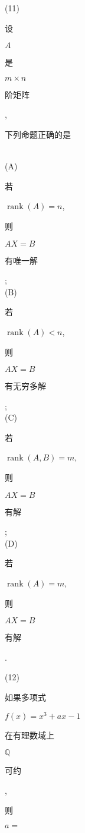 \documentclass[10pt]{article}
\begin{document}
(11) \begin{CJK}{UTF8}{mj}设\end{CJK} $A$ \begin{CJK}{UTF8}{mj}是\end{CJK} $m \times n$ \begin{CJK}{UTF8}{mj}阶矩阵\end{CJK},\begin{CJK}{UTF8}{mj}下列命题正确的是\end{CJK}\\
(A) \begin{CJK}{UTF8}{mj}若\end{CJK} $\operatorname{rank}(A)=n$, \begin{CJK}{UTF8}{mj}则\end{CJK} $A X=B$ \begin{CJK}{UTF8}{mj}有唯一解\end{CJK};\\
(B) \begin{CJK}{UTF8}{mj}若\end{CJK} $\operatorname{rank}(A)<n$, \begin{CJK}{UTF8}{mj}则\end{CJK} $A X=B$ \begin{CJK}{UTF8}{mj}有无穷多解\end{CJK};\\
(C) \begin{CJK}{UTF8}{mj}若\end{CJK} $\operatorname{rank}(A, B)=m$, \begin{CJK}{UTF8}{mj}则\end{CJK} $A X=B$ \begin{CJK}{UTF8}{mj}有解\end{CJK};\\
(D) \begin{CJK}{UTF8}{mj}若\end{CJK} $\operatorname{rank}(A)=m$, \begin{CJK}{UTF8}{mj}则\end{CJK} $A X=B$ \begin{CJK}{UTF8}{mj}有解\end{CJK}.

(12) \begin{CJK}{UTF8}{mj}如果多项式\end{CJK} $f(x)=x^{3}+a x-1$ \begin{CJK}{UTF8}{mj}在有理数域上\end{CJK} $\mathbb{Q}$ \begin{CJK}{UTF8}{mj}可约\end{CJK}, \begin{CJK}{UTF8}{mj}则\end{CJK} $a=$
\end{document}
